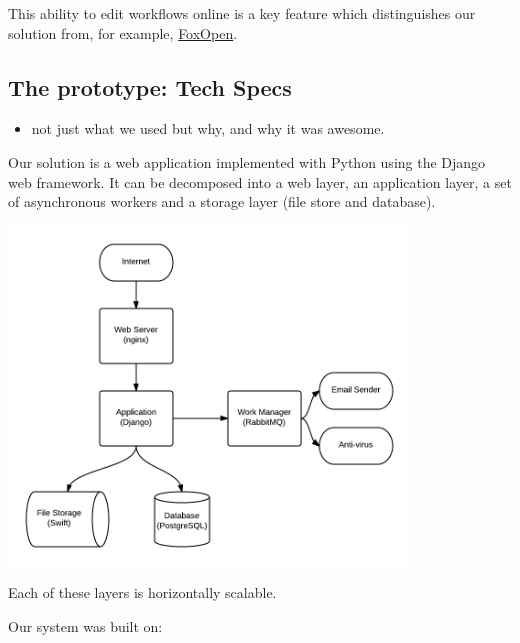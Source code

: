 \documentclass[12pt,a4paper,twosided]{article}
\begin{document}
This ability to edit workflows online is a key feature which
distinguishes our solution from, for example,
\href{http://www.foxopen.net/}{FoxOpen}.

\subsection{The prototype: Tech Specs}

\begin{itemize}

\item
  not just what we used but why, and why it was awesome.
\end{itemize}

Our solution is a web application implemented with Python using the
Django web framework. It can be decomposed into a web layer, an
application layer, a set of asynchronous workers and a storage layer
(file store and database).

\includegraphics[width=0.8\textwidth]{./tech-overview.png}

Each of these layers is horizontally scalable.

Our system was built on:
\end{document}
